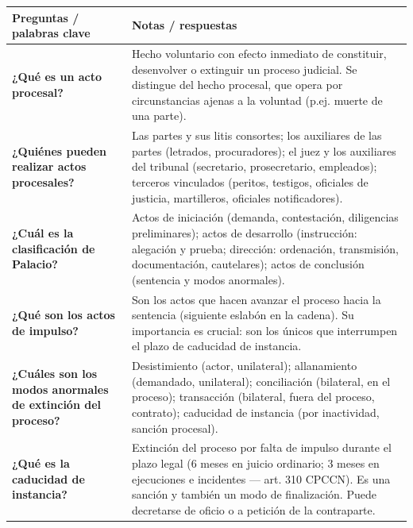 \documentclass[12pt,oneside]{book}
\begin{document}
\begin{table}[H]
\centering
\begin{tabularx}{\textwidth}{
    >{\raggedright\arraybackslash}p{}
    >{\raggedright\arraybackslash}X
}
\toprule
\textbf{Preguntas / palabras clave} & \textbf{Notas / respuestas} \\
\midrule

\textbf{¿Qué es un acto procesal?} &
Hecho voluntario con efecto inmediato de constituir, desenvolver o extinguir un proceso judicial. Se distingue del hecho procesal, que opera por circunstancias ajenas a la voluntad (p.ej. muerte de una parte). \\[0.5em]

\textbf{¿Quiénes pueden realizar actos procesales?} &
Las partes y sus litis consortes; los auxiliares de las partes (letrados, procuradores); el juez y los auxiliares del tribunal (secretario, prosecretario, empleados); terceros vinculados (peritos, testigos, oficiales de justicia, martilleros, oficiales notificadores). \\[0.5em]

\textbf{¿Cuál es la clasificación de Palacio?} &
Actos de iniciación (demanda, contestación, diligencias preliminares); actos de desarrollo (instrucción: alegación y prueba; dirección: ordenación, transmisión, documentación, cautelares); actos de conclusión (sentencia y modos anormales). \\[0.5em]

\textbf{¿Qué son los actos de impulso?} &
Son los actos que hacen avanzar el proceso hacia la sentencia (siguiente eslabón en la cadena). Su importancia es crucial: son los únicos que interrumpen el plazo de caducidad de instancia. \\[0.5em]

\textbf{¿Cuáles son los modos anormales de extinción del proceso?} &
Desistimiento (actor, unilateral); allanamiento (demandado, unilateral); conciliación (bilateral, en el proceso); transacción (bilateral, fuera del proceso, contrato); caducidad de instancia (por inactividad, sanción procesal). \\[0.5em]

\textbf{¿Qué es la caducidad de instancia?} &
Extinción del proceso por falta de impulso durante el plazo legal (6 meses en juicio ordinario; 3 meses en ejecuciones e incidentes --- art. 310 CPCCN). Es una sanción y también un modo de finalización. Puede decretarse de oficio o a petición de la contraparte. \\[0.5em]


\end{tabularx}
\end{table}
\end{document}
